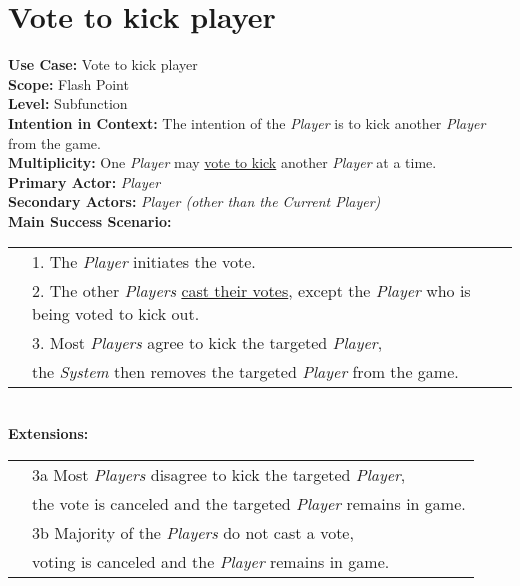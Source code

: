 \documentclass{article}
\begin{document}
	\section*{Vote to kick player}
	\textbf{Use Case:} Vote to kick player\\
	\textbf{Scope:} Flash Point\\
	\textbf{Level:} Subfunction\\
	\textbf{Intention in Context:} The intention of the \textit{Player} is to kick another \textit{Player} from the game.\\
	\textbf{Multiplicity: } One \textit{Player} may \underline{vote to kick} another \textit{Player} at a time.\\
	\textbf{Primary Actor:} \textit{Player}\\
	\textbf{Secondary Actors:} \textit{Player (other than the Current Player)}\\
	\textbf{Main Success Scenario:}\\
	\begin{tabular}{l l}
		&1. The \textit{Player} initiates the vote.\\
		&2. The other \textit{Players} \underline{cast their votes}, except the \textit{Player} who is being voted to kick out.\\
		&3. Most \textit{Players} agree to kick the targeted \textit{Player},\\
		&\qquad the \textit{System} then removes the targeted \textit{Player} from the game.
	\end{tabular}\\
	\textbf{Extensions: }\\
	\begin{tabular}{l l}
		&3a Most \textit{Players} disagree to kick the targeted \textit{Player},\\
		&\qquad the vote is canceled and the targeted \textit{Player} remains in game.\\
		&3b Majority of the \textit{Players} do not cast a vote,\\
		&\qquad voting is canceled and the \textit{Player} remains in game.
	\end{tabular}
\end{document}
